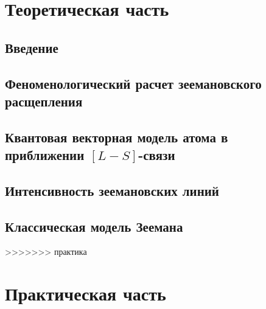 



\def\labauthors{}
\def\labgroup{430}
\def\labnumber{2}
\def\labtheme{Эффект Зеемана}
\renewcommand{\vec}{\mathbf}

\renewcommand{\phi}{\varphi}
\renewcommand{\hat}{\widehat}




\newpage
\section{Теоретическая часть}
\subsection{Введение}

\subsection{Феноменологический расчет зеемановского расщепления}

\subsection{Квантовая векторная модель атома в приближении $[L-S]$-связи}

\subsection{Интенсивность зеемановских линий}

\subsection{Классическая модель Зеемана}

>>>>>>> практика
\section{Практическая часть}



